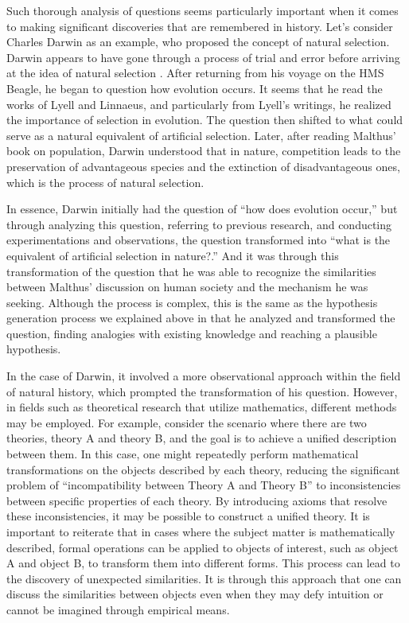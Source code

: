 \documentclass{book}
\begin{document}
Such thorough analysis of questions seems particularly important when it comes to making significant discoveries that are remembered in history. Let's consider Charles Darwin as an example, who proposed the concept of natural selection. Darwin appears to have gone through a process of trial and error before arriving at the idea of natural selection \cite{gribbin2022origin}. After returning from his voyage on the HMS Beagle, he began to question how evolution occurs. It seems that he read the works of Lyell and Linnaeus, and particularly from Lyell's writings, he realized the importance of selection in evolution. The question then shifted to what could serve as a natural equivalent of artificial selection. Later, after reading Malthus' book on population, Darwin understood that in nature, competition leads to the preservation of advantageous species and the extinction of disadvantageous ones, which is the process of natural selection.

In essence, Darwin initially had the question of ``how does evolution occur,'' but through analyzing this question, referring to previous research, and conducting experimentations and observations, the question transformed into ``what is the equivalent of artificial selection in nature?.'' And it was through this transformation of the question that he was able to recognize the similarities between Malthus' discussion on human society and the mechanism he was seeking. Although the process is complex, this is the same as the hypothesis generation process we explained above in that he analyzed and transformed the question, finding analogies with existing knowledge and reaching a plausible hypothesis.

In the case of Darwin, it involved a more observational approach within the field of natural history, which prompted the transformation of his question. However, in fields such as theoretical research that utilize mathematics, different methods may be employed. For example, consider the scenario where there are two theories, theory A and theory B, and the goal is to achieve a unified description between them. In this case, one might repeatedly perform mathematical transformations on the objects described by each theory, reducing the significant problem of ``incompatibility between Theory A and Theory B'' to inconsistencies between specific properties of each theory. By introducing axioms that resolve these inconsistencies, it may be possible to construct a unified theory. It is important to reiterate that in cases where the subject matter is mathematically described, formal operations can be applied to objects of interest, such as object A and object B, to transform them into different forms. This process can lead to the discovery of unexpected similarities. It is through this approach that one can discuss the similarities between objects even when they may defy intuition or cannot be imagined through empirical means. 
\end{document}
